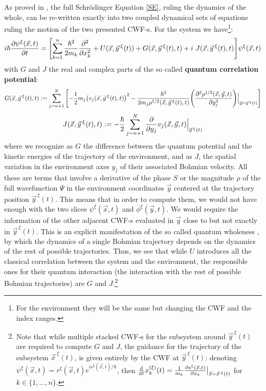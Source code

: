 \documentclass[11pt, a4paper]{article} %
\begin{document}
As proved in \cite{GJ}, the full Schrödinger Equation \eqref{SE}, ruling the dynamics of the whole, can be re-written exactly into two coupled dynamical sets of equations ruling the motion of the two presented CWF-s. For the system we have\footnote{For the environment they will be the same but changing the CWF and the index ranges.}:\vspace{-0.2cm}
\begin{equation}\label{SE.GJ}
i \hbar \pdv{\psi^\xi (\vec{x},t)}{t} = \qty[\sum_{k=1}^n\frac{\hbar^2}{2m_k} \pdv[2]{}{x_k} +  U(\vec{x}, \vec{y}^{\: \xi}(t)) + G(\vec{x}, \vec{y}^{\: \xi}(t),t)+i\ J(\vec{x}, \vec{y}^{\: \xi}(t),t)] \psi^\xi (\vec{x},t)
\end{equation}
with $G$ and $J$ the real and complex parts of the so called {\bf quantum correlation potential}:
\begin{equation}\label{G.Bohm}
G(\vec{x},\vec{y}^{\:\xi}(t),t):=\sum_{j=n+1}^N\qty[-\frac{1}{2}m_j\qty(v_j(\vec{x},\vec{y}^{\: \xi}(t),t))^2-\frac{\hbar^2}{2m_j\rho^{1/2}(\vec{x},\vec{y}^{\:\xi}(t),t)}\qty(\pdv[2]{\rho^{1/2}(\vec{x},\vec{y},t)}{y_j})\Big\rvert_{\vec{y}=\vec{y}^{\:\xi}(t)} ]\vspace{-0.2cm}
\end{equation}
\begin{equation}\label{J.Bohm}
J(\vec{x},\vec{y}^{\:\xi}(t),t):=-\frac{\hbar}{2}\sum_{j=n+1}^N\pdv{}{y_j}v_j(\vec{x},\vec{y},t)\Big\rvert_{\vec{y}^{\, \xi}(t)}
\end{equation}
where we recognize as $G$ the difference between the quantum potential \cite{JordiXavier, Durr} and the kinetic energies of the trajectory of the environment, and as $J$, the spatial variation in the environment axes $y_j$ of their associated Bohmian velocity. All these are terms that involve a derivative of the phase $S$ or the magnitude $\rho$ of the full wavefunction $\Psi$ in the environment coordinates $\vec{y}$ centered at the trajectory position $\vec{y}^{\:\xi}(t)$. This means that in order to compute them, we would not have enough with the two slices $\psi^\xi(\vec{x},t)$ and $\phi^\xi(\vec{y},t)$. We would require the information of the other adjacent CWF-s evaluated in $\vec{y}$ close to but not exactly in $\vec{y}^{\:\xi}(t)$. This is an explicit manifestation of the so called quantum wholeness \cite{JordiXavier}, by which the dynamics of a single Bohmian trajectory depends on the dynamics of the rest of possible trajectories. Thus, we see that while $U$ introduces all the classical correlation between the system and the environment, the responsible ones for their quantum interaction (the interaction with the rest of possible Bohmian trajectories) are $G$ and $J$.\footnote{Note that while multiple stacked CWF-s for the subsystem around $\vec{y}^{\:\xi}(t)$ are required to compute $G$ and $J$, the guidance for the trajectory of the subsystem $\vec{x}^{\:\xi}(t)$, is given entirely by the CWF at $\vec{y}^{\:\xi}(t)$: denoting $\psi^\xi (\vec{x},t)=r^\xi(\vec{x},t)e^{is^\xi(\vec{x},t)/\hbar}$, then $\dv{}{t}x_k^{(\xi)}(t)=\frac{1}{m_k}\pdv{s^\xi(\vec{x},t)}{x_k}\big\rvert_{\vec{x}=\vec{x}^{\:\xi}(t)}$ for $k\in\{1,...,n\}$.}\vspace{-0.15cm}
\end{document}
